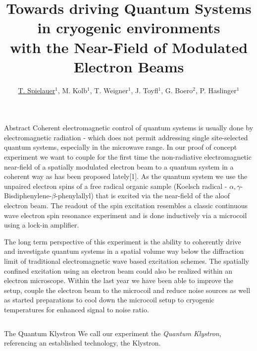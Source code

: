 \documentclass[final]{beamer}
\title{Towards driving Quantum Systems in cryogenic environments\hspace*{1cm} \\ with the Near-Field of Modulated Electron Beams}
\author{\underline{T. Spielauer$^{1}$}, M. Kolb$^{1}$, T. Weigner$^{1}$, J. Toyfl$^{1}$, G. Boero$^{2}$, P. Haslinger$^{1}$ }
\institute[]{
  {\small
  $^{1}$VCQ, Technische Universität Wien, Atominstitut, Stadionallee 2, 1020 Vienna, Austria; $^{2}$EPFL, BM 3110 Station 17, CH-1015 Lausanne, Switzerland
  }
}
\begin{document}
\begin{frame}[fragile]{}
  \begin{block}{\large Abstract}
    Coherent electromagnetic control of quantum systems is usually done by
    electromagnetic radiation - which does not permit addressing single site-selected
    quantum systems, especially in the microwave range. In our proof of concept
    experiment we want to couple for the first time the non-radiative electromagnetic
    near-field of a spatially modulated electron beam to a quantum system in
    a coherent way as has been proposed lately[1].  As the quantum system we
    use the unpaired electron spins of a free radical organic sample (Koelsch radical
    - $\alpha,\gamma$-Bisdiphenylene-$\beta$-phenylallyl) that is excited via the
    near-field of the aloof electron beam. The readout of the spin excitation
    resembles a classic continuous wave electron spin resonance experiment and is
    done inductively via a microcoil using a lock-in amplifier.

    The long term perspective of this experiment is the ability to coherently drive
    and investigate quantum systems in a spatial volume way below the diffraction
    limit of traditional electromagnetic wave based excitation schemes. The spatially
    confined excitation using an electron beam could also be realized within
    an electron microscope. Within the last year we have been able to improve
    the setup, couple the electron beam to the microcoil and reduce noise sources
    as well as started preparations to cool down the microcoil setup to cryogenic
    temperatures for enhanced signal to noise ratio.
  \end{block}
  \begin{columns}[T]
    \begin{column}{.49\linewidth}
      \begin{block}{\large The Quantum Klystron}
        We call our experiment the \textit{Quantum Klystron}, referencing an established
        technology, the Klystron.


\end{block}
\end{column}
\end{columns}
\end{frame}
\end{document}
